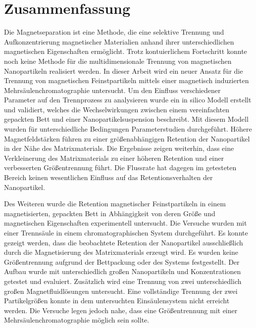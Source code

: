 \chapter{Zusammenfassung}
\label{ch:abstract_de}
Die Magnetseparation ist eine Methode, die eine selektive Trennung und Aufkonzentrierung magnetischer Materialien anhand ihrer unterschiedlichen magnetischen Eigenschaften ermöglicht. Trotz kontuierlichem Fortschritt konnte noch keine Methode für die multidimensionale Trennung von magnetischen Nanopartikeln realisiert werden. In dieser Arbeit wird ein neuer Ansatz für die Trennung von magnetischen Feinstpartikeln mittels einer magnetisch induzierten Mehrsäulenchromatographie untersucht. Um den Einfluss verschiedener Parameter auf den Trennprozess zu analysieren wurde ein in silico Modell erstellt und validiert, welches die Wechselwirkungen zwischen einem vereinfachten gepackten Bett und einer Nanopartikelsuspension beschreibt. Mit diesem Modell wurden für unterschiedliche Bedingungen Parameterstudien durchgeführt. Höhere Magnetfeldstärken führen zu einer größenabhängigen Retention der Nanopartikel in der Nähe des Matrixmaterials. Die Ergebnisse zeigen weiterhin, dass eine Verkleinerung des Matrixmaterials zu einer höheren Retention und einer verbesserten Größentrennung führt. Die Flussrate hat dagegen im getesteten Bereich keinen wesentlichen Einfluss auf das Retentionsverhalten der Nanopartikel.

Des Weiteren wurde die Retention magnetischer Feinstpartikeln
in einem magnetisierten, gepackten Bett in Abhängigkeit von deren Größe und magnetischen Eigenschaften experimentell untersucht. Die Versuche wurden mit einer Trennsäule in einem chromatographischen System durchgeführt. Es konnte gezeigt werden, dass die beobachtete Retention der Nanopartikel ausschließlich durch die Magnetisierung des Matrixmaterials erzeugt wird. Es wurden keine Größentrennung aufgrund der Bettpackung oder des Systems festgestellt. Der Aufbau wurde mit unterschiedlich großen Nanopartikeln und Konzentrationen getestet und evaluiert. Zusätzlich wird eine Trennung von zwei unterschiedlich großen Magnetfluidlösungen untersucht. Eine vollständige Trennung der zwei Partikelgrößen konnte in dem untersuchten Einsäulensystem nicht erreicht werden. Die Versuche legen jedoch nahe, dass eine Größentrennung mit einer Mehrsäulenchromatographie möglich sein sollte.  